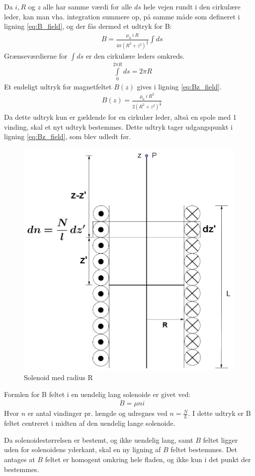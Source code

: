 Da $i, R$ og $z$ alle har samme værdi for alle $ds$ hele vejen rundt i den cirkulære leder, kan man vha. integration summere op, på samme måde som defineret i ligning \ref{eq:B_field}, og der fås dermed et udtryk for B:
\begin{align}
&B=\frac{\mu_0 \: i \: R}{4\pi(R^2+z^2)^\frac{3}{2}}\int ds
\end{align}
Grænseværdierne for $\int ds$ er den cirkulære leders omkreds.
\begin{align}
&\int\limits_{0}^{2\pi R} ds = 2\pi R
\end{align}
Et endeligt udtryk for magnetfeltet $B(z)$ gives i ligning \ref{eq:Bz_field}.
\begin{align}
	&B(z)=\frac{\mu_0 \: i \: R^2}{2(R^2+z^2)^\frac{3}{2}} \label{eq:Bz_field}
\end{align}
Da dette udtryk kun er gældende for en cirkulær leder, altså en spole med 1 vinding, skal et nyt udtryk bestemmes. Dette udtryk tager udgangspunkt i ligning \ref{eq:Bz_field}, som blev udledt før.
\begin{figure}[h!]
	\centering
	\includegraphics[width=.5\textwidth]{billeder/B_felt2.png}
	\caption{Solenoid med radius R}
	\label{fig:spole_fig2}
\end{figure}
Formlen for B feltet i en uendelig lang solenoide er givet ved:
\begin{align}
	&B=\mu ni
\end{align}
Hvor $n$ er antal vindinger pr. længde og udregnes ved $n=\frac{N}{L}$.
I dette udtryk er B feltet centreret i midten af den uendelig lange solenoide.

Da solenoidestørrelsen er bestemt, og ikke uendelig lang, samt $B$ feltet ligger uden for solenoidens yderkant, skal en ny ligning af $B$ feltet bestemmes.
Det antages at $B$ feltet er homogent omkring hele fladen, og ikke kun i det punkt der bestemmes.


